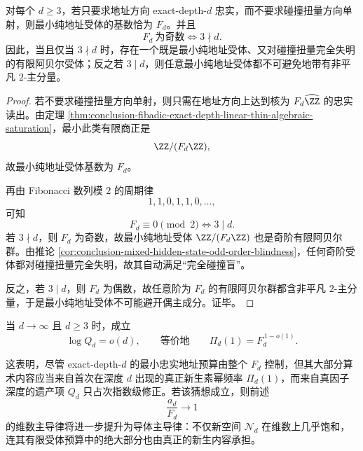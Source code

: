 \begin{corollary}[三倍数深度的奇偶分裂门槛]\label{cor:conclusion-fibadic-depth-triple-divisibility-odd-address-threshold}
对每个 \(d\ge 3\)，若只要求地址方向 exact-depth-\(d\) 忠实，而不要求碰撞扭量方向单射，则最小纯地址受体的基数恰为 \(F_d\)。并且
\[
F_d\ \text{为奇数}
\iff
3\nmid d.
\]
因此，当且仅当 \(3\nmid d\) 时，存在一个既是最小纯地址受体、又对碰撞扭量完全失明的有限阿贝尔受体；反之若 \(3\mid d\)，则任意最小纯地址受体都不可避免地带有非平凡 \(2\)-主分量。
\end{corollary}
\begin{proof}
若不要求碰撞扭量方向单射，则只需在地址方向上达到核为 \(F_d\widehat{\ZZ}\) 的忠实读出。由定理
\ref{thm:conclusion-fibadic-exact-depth-linear-thin-algebraic-saturation}，最小此类有限商正是
\[
\ZZ/(F_d\ZZ),
\]
故最小纯地址受体基数为 \(F_d\)。

再由 Fibonacci 数列模 \(2\) 的周期律
\[
1,1,0,1,1,0,\dots,
\]
可知
\[
F_d\equiv 0\pmod 2
\iff
3\mid d.
\]
若 \(3\nmid d\)，则 \(F_d\) 为奇数，故最小纯地址受体 \(\ZZ/(F_d\ZZ)\) 也是奇阶有限阿贝尔群。由推论
\ref{cor:conclusion-mixed-hidden-state-odd-order-blindness}，任何奇阶受体都对碰撞扭量完全失明，故其自动满足“完全碰撞盲”。

反之，若 \(3\mid d\)，则 \(F_d\) 为偶数，故任意阶为 \(F_d\) 的有限阿贝尔群都含非平凡 \(2\)-主分量，于是最小纯地址受体不可能避开偶主成分。证毕。
\end{proof}

\begin{conjecture}[新生内容主导]\label{conj:conclusion-fibadic-new-content-dominates-conductor}
当 \(d\to\infty\) 且 \(d\ge 3\) 时，成立
\[
\log Q_d=o(d),
\qquad\text{等价地}\qquad
\Pi_d(1)=F_d^{\,1-o(1)}.
\]
\end{conjecture}

\noindent
这表明，尽管 exact-depth-\(d\) 的最小忠实地址预算由整个 \(F_d\) 控制，但其大部分算术内容应当来自首次在深度 \(d\) 出现的真正新生素幂频率 \(\Pi_d(1)\)，而来自真因子深度的遗产项 \(Q_d\) 只占次指数级修正。若该猜想成立，则前述
\[
\frac{a_d}{F_d}\to 1
\]
的维数主导律将进一步提升为导体主导律：不仅新空间 \(\mathcal N_d\) 在维数上几乎饱和，连其有限受体预算中的绝大部分也由真正的新生内容承担。

